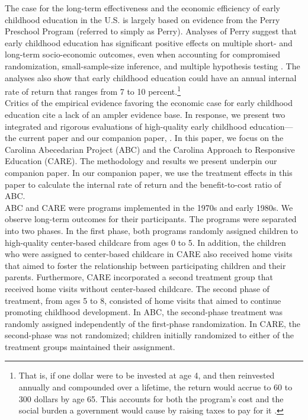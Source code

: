 \noindent  The case for the long-term effectiveness and the economic efficiency of early childhood education in the U.S. is largely based on evidence from the Perry Preschool Program (referred to simply as Perry). Analyses of Perry suggest that early childhood education has significant positive effects on multiple short- and long-term socio-economic outcomes, even when accounting for compromised randomization, small-sample-size inference, and multiple hypothesis testing \citep{Heckman_Moon_etal_2010_QE}. The analyses also show that early childhood education could have an annual internal rate of return that ranges from 7 to 10 percent.\footnote{That is, if one dollar were to be invested at age 4, and then reinvested annually and compounded over a lifetime, the return would accrue to 60 to 300 dollars by age 65. This accounts for both the program's cost and the social burden a government would cause by raising taxes to pay for it \citep{Heckman_Moon_etal_2010_RateofReturn}.}\\

\noindent Critics of the empirical evidence favoring the economic case for early childhood education cite a lack of an ampler evidence base. In response, we present two integrated and rigorous evaluations of high-quality early childhood education---the current paper and our companion paper, \citet{Garcia_et_al_2016_ABC_unpublished}. In this paper, we focus on the Carolina Abecedarian Project (ABC) and the Carolina Approach to Responsive Education (CARE). The methodology and results we present underpin our companion paper. In our companion paper, we use the treatment effects in this paper to calculate the internal rate of return and the benefit-to-cost ratio of ABC.\\

\noindent ABC and CARE were programs implemented in the 1970s and early 1980s. We observe long-term outcomes for their participants. The programs were separated into two phases. In the first phase, both programs randomly assigned children to high-quality center-based childcare from ages 0 to 5. In addition, the children who were assigned to center-based childcare in CARE also received home visits that aimed to foster the relationship between participating children and their parents. Furthermore, CARE incorporated a second treatment group that received home visits without center-based childcare. The second phase of treatment, from ages 5 to 8, consisted of home visits that aimed to continue promoting childhood development. In ABC, the second-phase treatment was randomly assigned independently of the first-phase randomization. In CARE, the second-phase was not randomized; children initially randomized to either of the treatment groups maintained their assignment.\\

